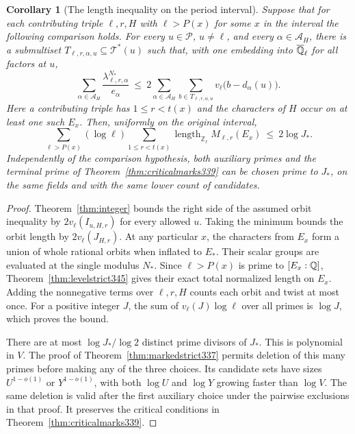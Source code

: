 \documentclass[a4paper,11pt]{article}
\newtheorem{corollary}[proposition]{Corollary}
\theoremstyle{definition}
\theoremstyle{remark}
\newcommand{\ZZ}{\mathbb Z}\newcommand{\ord}{\operatorname{ord}}
\newcommand{\len}{\operatorname{length}}\newcommand{\Res}{\operatorname*{Res}}
\numberwithin{equation}{section}
\begin{document}
\begin{corollary}[The length inequality on the period interval]\leavevmode\label{cor:heckebudget345}
Suppose that for each contributing triple $\ell,r,H$ with
$\ell>P(x)$ for some $x$ in the interval the following
comparison holds. For every $u\in\mathcal P$, $u\ne\ell$, and
every $\alpha\in\mathcal A_H$, there is a submultiset
$T_{\ell,r,\alpha,u}\subseteq\mathcal T^*(u)$ such that, with
one embedding into $\overline{\mathbb Q}_\ell$ for all factors at $u$,
\[
 \sum_{\alpha\in\mathcal A_H}\frac{\lambda^{N_*}_{\ell,r,\alpha}}{e_\alpha}
 \ \le\ 2\sum_{\alpha\in\mathcal A_H}
               \sum_{b\in T_{\ell,r,\alpha,u}}
                          v_\ell\bigl(b-d_\alpha(u)\bigr).
\]
Here a contributing triple has $1\le r<t(x)$ and the characters
of $H$ occur on at least one such $E_x$. Then, uniformly on the
original interval,
\[
 \sum_{\ell>P(x)}(\log\ell)\sum_{1\le r<t(x)}
             \len_{\ZZ_\ell} M_{\ell,r}(E_x)
       \ \le\ 2\log J_* .
\]
Independently of the comparison hypothesis, both auxiliary primes
and the terminal prime of Theorem~\ref{thm:criticalmarks339} can
be chosen prime to $J_*$, on the same fields and with the same
lower count of candidates.
\end{corollary}
\begin{proof}
Theorem~\ref{thm:integer} bounds the right side of the assumed
orbit inequality by $2v_\ell(I_{u,H,r})$ for every allowed $u$.
Taking the minimum bounds the orbit length by $2v_\ell(J_{H,r})$.
At any particular $x$, the characters from $E_x$ form a union of
whole rational orbits when inflated to $E_*$. Their scalar groups
are evaluated at the single modulus $N_*$. Since $\ell>P(x)$ is
prime to $[E_x:\mathbb Q]$, Theorem~\ref{thm:levelstrict345} gives their
exact total normalized length on $E_x$. Adding the nonnegative
terms over $\ell,r,H$ counts each orbit and twist at most once.
For a positive integer $J$, the sum of $v_\ell(J)\log\ell$ over
all primes is $\log J$, which proves the bound.

There are at most $\log J_*/\log2$ distinct prime divisors of
$J_*$. This is polynomial in $V$. The proof of
Theorem~\ref{thm:markedstrict337} permits deletion of this many
primes before making any of the three choices. Its candidate
sets have sizes $U^{1-o(1)}$ or $Y^{1-o(1)}$, with both
$\log U$ and $\log Y$ growing faster than $\log V$. The same
deletion is valid after the first auxiliary choice under the
pairwise exclusions in that proof. It preserves the critical
conditions in Theorem~\ref{thm:criticalmarks339}.
\end{proof}
\end{document}
